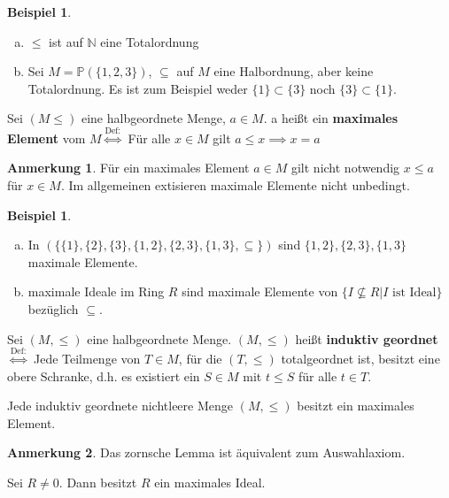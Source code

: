 \documentclass[a4paper, titlepage]{article}
\theoremstyle{definition}
\newtheorem{bsp}[satz]{Beispiel}
\newtheorem*{anm}{Anmerkung}
\newcommand{\N}{\mathbb{N}}
\begin{document}
\begin{bsp}
    \begin{enumerate}[(a)]
        \item $\leq$ ist auf $\N$ eine Totalordnung 
        \item Sei $M=\mathbb{P}(\{1,2,3\})$, $\subseteq$ auf $M$ eine Halbordnung, aber keine Totalordnung. Es ist zum Beispiel weder $\{1\}\subset\{3\}$ noch $\{3\}\subset\{1\}$.
    \end{enumerate}
\end{bsp}
\begin{definition}
    Sei $(M\leq)$ eine halbgeordnete Menge, $a\in M$. a heißt ein \textbf{maximales Element} vom $M \overset{\text{Def:}}\Leftrightarrow$ Für alle $x\in M$ gilt $a\leq x \implies x=a$
\end{definition}
\begin{anm}
    Für ein maximales Element $a\in M$ gilt nicht notwendig $x\leq a$ für $x\in M$. Im allgemeinen extisieren maximale Elemente nicht unbedingt.
\end{anm}
\begin{bsp}
    \begin{enumerate}[(a)]
        \item  In $(\{\{1\},\{2\},\{3\},\{1,2\},\{2,3\},\{1,3\},\subseteq\})$ sind $\{1,2\},\{2,3\},\{1,3\}$ maximale Elemente.
        \item maximale Ideale im Ring $R$ sind maximale Elemente von $\{I\not\subseteq R|I\text{ ist Ideal}\}$ bezüglich $\subseteq$.
    \end{enumerate}
\end{bsp}
\begin{definition}
    Sei $(M,\leq)$ eine halbgeordnete Menge. $(M,\leq)$ heißt \textbf{induktiv geordnet}$\overset{\text{Def:}}\Leftrightarrow$ Jede Teilmenge von $T\in M$, für die $(T,\leq)$ totalgeordnet ist, besitzt eine obere Schranke, d.h. es existiert ein $S\in M$ mit $t\leq S$ für alle $t\in T$.
\end{definition}
\begin{satz}
    Jede induktiv geordnete nichtleere Menge $(M,\leq)$ besitzt ein maximales Element.
\end{satz}
\begin{anm}
    Das zornsche Lemma ist äquivalent zum Auswahlaxiom.
\end{anm}
\begin{satz}
    Sei $R\neq 0$. Dann besitzt $R$ ein maximales Ideal.
\end{satz}
\end{document}
